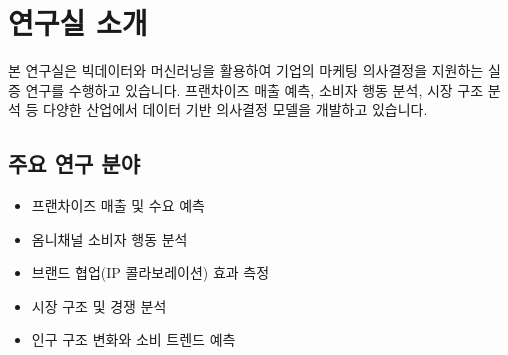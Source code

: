 \documentclass[11pt, a4paper]{article}
\begin{document}
\section*{연구실 소개}

\vspace{1em}

\noindent
{}

\vspace{1.5em}

본 연구실은 빅데이터와 머신러닝을 활용하여 기업의 마케팅 의사결정을 지원하는 실증 연구를 수행하고 있습니다. 프랜차이즈 매출 예측, 소비자 행동 분석, 시장 구조 분석 등 다양한 산업에서 데이터 기반 의사결정 모델을 개발하고 있습니다.

\vspace{1em}

\subsection*{주요 연구 분야}
\begin{itemize}[leftmargin=1.5em, itemsep=4pt]
  \item 프랜차이즈 매출 및 수요 예측
  \item 옴니채널 소비자 행동 분석
  \item 브랜드 협업(IP 콜라보레이션) 효과 측정
  \item 시장 구조 및 경쟁 분석
  \item 인구 구조 변화와 소비 트렌드 예측
\end{itemize}

\vspace{3em}

\begin{center}
\end{center}
\end{document}
